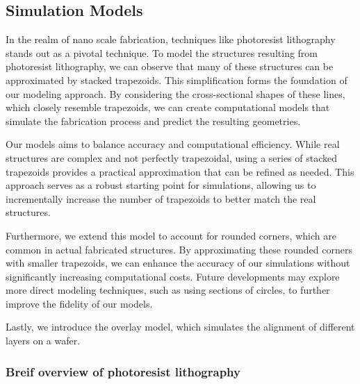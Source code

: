 \medskip

\subsection{Simulation Models}

In the realm of nano scale fabrication, techniques like photoresist lithography stands out as a pivotal technique. To model the structures 
resulting from photoresist lithography, we can observe that many of these structures can be approximated by stacked trapezoids. 
This simplification forms the foundation of our modeling approach. By considering the cross-sectional shapes of these lines, which 
closely resemble trapezoids, we can create computational models that simulate the fabrication process and predict the resulting 
geometries.

\medskip

Our models aims to balance accuracy and computational efficiency. While real structures are complex and not perfectly trapezoidal, 
using a series of stacked trapezoids provides a practical approximation that can be refined as needed. This approach serves as a robust
starting point for simulations, allowing us to incrementally increase the number of trapezoids to better match the real structures.

\medskip

Furthermore, we extend this model to account for rounded corners, which are common in actual fabricated structures. By approximating 
these rounded corners with smaller trapezoids, we can enhance the accuracy of our simulations without significantly increasing 
computational costs. Future developments may explore more direct modeling techniques, such as using sections of circles, to further
improve the fidelity of our models.

\medskip

Lastly, we introduce the overlay model, which simulates the alignment of different layers on a wafer.


\subsubsection{Breif overview of photoresist lithography}

